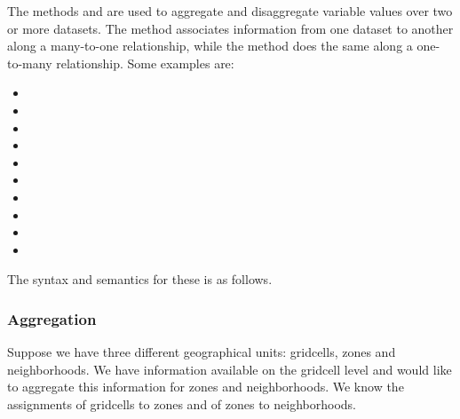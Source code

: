 The methods  and  are used to
aggregate and disaggregate variable values over two or more datasets.  
  The  method associates
information from one dataset to another along a many-to-one relationship, while
the  method does the same along a one-to-many relationship. Some
examples are:

\begin{itemize}
\item {}

\item {}

\item {}

\item {}

\item {}

\item {}

\item {}

\item {}

\item {}

\item {}

\end{itemize}

The syntax and semantics for these is as follows.

\subsubsection{Aggregation}

Suppose we have three different geographical units: gridcells, zones and
neighborhoods.  We have information available on the gridcell level and
would like to aggregate this information for zones and neighborhoods. We
know the assignments of gridcells to zones and of zones to neighborhoods.

